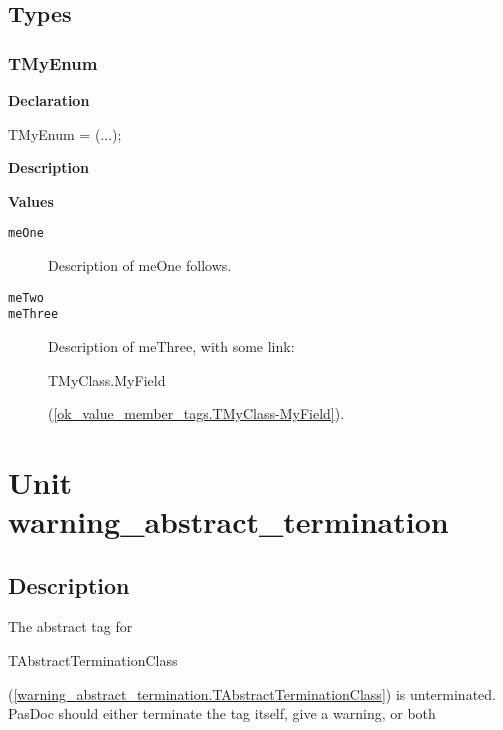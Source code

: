 \documentclass{report}
\begin{document}
\section{Types}
\subsection*{TMyEnum}
\begin{list}{}{
\setlength{\itemindent}{0cm}
\setlength{\listparindent}{0cm}
\setlength{\leftmargin}{\evensidemargin}
\addtolength{\leftmargin}{\tmplength}
\settowidth{\labelsep}{X}
\addtolength{\leftmargin}{\labelsep}
\setlength{\labelwidth}{\tmplength}
}
\begin{flushleft}
\item[\textbf{Declaration}\hfill]
\begin{ttfamily}
TMyEnum = (...);\end{ttfamily}


\end{flushleft}
\par
\item[\textbf{Description}]
 \item[\textbf{Values}]
\begin{description}
\item[\texttt{meOne}] Description of meOne follows.
\item[\texttt{meTwo}]  
\item[\texttt{meThree}] Description of meThree, with some link: \begin{ttfamily}TMyClass.MyField\end{ttfamily}(\ref{ok_value_member_tags.TMyClass-MyField}).
\end{description}


\end{list}
\chapter{Unit warning{\_}abstract{\_}termination}
\section{Description}
The abstract tag for \begin{ttfamily}TAbstractTerminationClass\end{ttfamily}(\ref{warning_abstract_termination.TAbstractTerminationClass}) is unterminated. PasDoc should either terminate the tag itself, give a warning, or both\hfill\vspace*{1ex}
\end{document}
